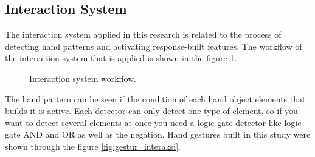 \documentclass[conference]{IEEEtran}
\begin{document}
	\subsection{Interaction System}
		The interaction system applied in this research is related to the process of detecting hand patterns and activating response-built features. The workflow of the interaction system that is applied is shown in the figure \ref{fig:desain_interaksi}.
		\vspace{-2ex}
		\begin{figure}[h]
			\caption{Interaction system workflow.}
			\label{fig:desain_interaksi}
		\end{figure}
		\vspace{-2ex}
		
		The hand pattern can be seen if the condition of each hand object elements that builds it is active. Each detector can only detect one type of element, so if you want to detect several elements at once you need a logic gate detector like logic gate AND and OR as well as the negation. Hand gestures built in this study were shown through the figure \ref{fig:gestur_interaksi}.
	
\end{document}

